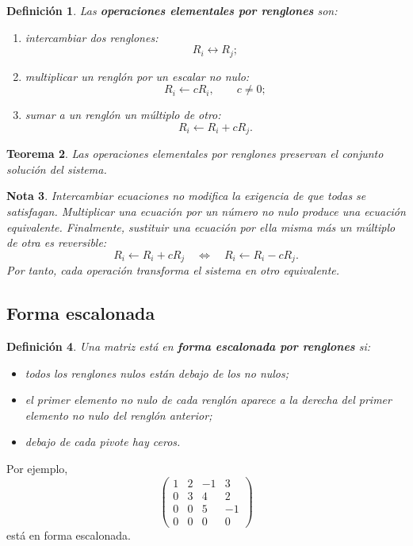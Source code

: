 \documentclass[12pt]{article}
\newtheorem{definicion}{Definición}[section]
\newtheorem{teorema}[definicion]{Teorema}
\newtheorem{Nota}[definicion]{Nota}
\theoremstyle{remark}
\begin{document}
\begin{definicion}
Las \textbf{operaciones elementales por renglones} son:
\begin{enumerate}
\item intercambiar dos renglones:
\[
R_i\leftrightarrow R_j;
\]
\item multiplicar un renglón por un escalar no nulo:
\[
R_i\leftarrow cR_i,\qquad c\neq0;
\]
\item sumar a un renglón un múltiplo de otro:
\[
R_i\leftarrow R_i+cR_j.
\]
\end{enumerate}
\end{definicion}

\begin{teorema}
Las operaciones elementales por renglones preservan el conjunto solución del sistema.
\end{teorema}

\begin{Nota}
Intercambiar ecuaciones no modifica la exigencia de que todas se satisfagan. Multiplicar una ecuación
por un número no nulo produce una ecuación equivalente. Finalmente, sustituir una ecuación por ella
misma más un múltiplo de otra es reversible:
\[
R_i\leftarrow R_i+cR_j
\quad\Longleftrightarrow\quad
R_i\leftarrow R_i-cR_j.
\]
Por tanto, cada operación transforma el sistema en otro equivalente.
\end{Nota}
\subsection*{Forma escalonada}
\begin{definicion}
Una matriz está en \textbf{forma escalonada por renglones} si:
\begin{itemize}
\item todos los renglones nulos están debajo de los no nulos;
\item el primer elemento no nulo de cada renglón aparece a la derecha del primer elemento no nulo
del renglón anterior;
\item debajo de cada pivote hay ceros.
\end{itemize}
\end{definicion}

Por ejemplo,
\[
\begin{pmatrix}
1&2&-1&3\\
0&3&4&2\\
0&0&5&-1\\
0&0&0&0
\end{pmatrix}
\]
está en forma escalonada.
\end{document}
